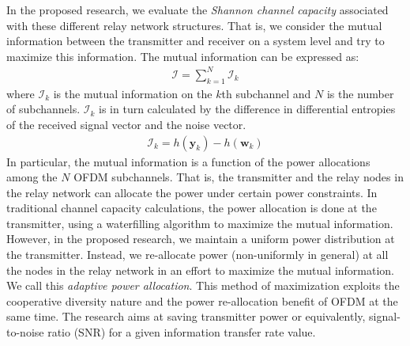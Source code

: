 \documentclass[12]{article}
\begin{document}
In the proposed research, we evaluate the \emph{Shannon channel capacity} associated with these different relay network structures.  That is, we consider the mutual information between the transmitter and receiver on a system level and try to maximize this information.  The mutual information can be expressed as:
\begin{eqnarray}
\mathcal{I} = \sum_{k=1}^N \mathcal{I}_k
\end{eqnarray} 
where $\mathcal{I}_k$ is the mutual information on the $k$th subchannel and $N$ is the number of subchannels.  $\mathcal{I}_k$ is in turn calculated by the difference in differential entropies of the received signal vector and the noise vector.
\begin{eqnarray}
\mathcal{I}_k = h \left( \mathbf y_k \right) - h \left( \mathbf w_k \right)
\end{eqnarray}
In particular, the mutual information is a function of the power allocations among the $N$ OFDM subchannels.  That is, the transmitter and the relay nodes in the relay network can allocate the power under certain power constraints.  In traditional channel capacity calculations, the power allocation is done at the transmitter, using a waterfilling algorithm to maximize the mutual information.  However, in the proposed research, we maintain a uniform power distribution at the transmitter.  Instead, we re-allocate power (non-uniformly in general) at all the nodes in the relay network in an effort to maximize the mutual information.  We call this \emph{adaptive power allocation}.  This method of maximization exploits the cooperative diversity nature and the power re-allocation benefit of OFDM at the same time.  The research aims at saving transmitter power or equivalently, signal-to-noise ratio (SNR) for a given information transfer rate value.
\end{document}
